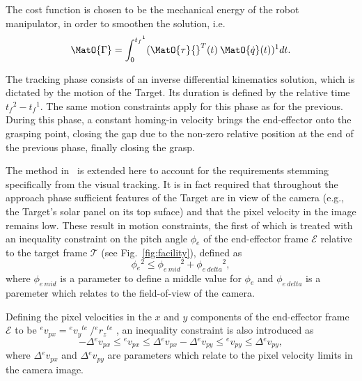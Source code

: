 {The cost function is chosen to be the mechanical energy of the robot manipulator, in order to smoothen the solution, i.e.
\begin{equation}
\MatO{\Gamma} = \int^{t_f{}^1}_{0} (\MatO{\tau}{}^{T}(t) \: \MatO{\dot{q}}(t)){}^{1} dt.
\label{eq:cost}
\end{equation} 

The tracking phase consists of an inverse differential kinematics solution, which is dictated by the motion of the Target. Its duration is defined by the relative time $t_f{}^2 - t_f{}^1$. The same motion constraints apply for this phase as for the previous. During this phase, a constant homing-in velocity brings the end-effector onto the grasping point, closing the gap due to the non-zero relative position at the end of the previous phase, finally closing the grasp. 
} 

The method in~\cite{lampariello2013generating} is extended here to account for the requirements stemming specifically from the visual tracking. It is in fact required that throughout the approach phase sufficient features of the Target are in view of the camera (e.g., the Target's solar panel on its top suface) and that the pixel velocity in the image remains low. These result in motion constraints, the first of which is treated with an inequality constraint on the pitch angle $\phi{}_{e}$ of the end-effector frame $\mathcal{E}$  relative to the target frame $\mathcal{T}$ (see Fig.~\ref{fig:facility}), defined as
\begin{equation}
\phi{}_{e}{}^{2} \leq \phi_{e \: mid}{}^{2} + \phi_{e \: delta}{}^{2},
\end{equation}
where $\phi_{e \: mid}$ is a parameter to define a middle value for $\phi{}_{e}$ and $\phi_{e \: delta}$ is a paremeter which relates to the field-of-view of the camera. 

Defining the pixel velocities in the $x$ and $y$ components of the end-effector frame $\mathcal{E}$ to be ${}^{e}v{}_{px}={}^{e}v{}_{y}{}^{te}\ / {}^{e}r{}_{z}{}^{te}$ , an inequality constraint is also introduced as
\begin{equation}
-\Delta {}^{e}v{}_{px}  \leq {}^{e}v{}_{px} \leq \Delta {}^{e}v{}_{px}
-\Delta {}^{e}v{}_{py}  \leq {}^{e}v{}_{py} \leq \Delta {}^{e}v{}_{py},
\end{equation}
where $\Delta {}^{e}v{}_{px}$ and $\Delta {}^{e}v{}_{py}$ are parameters which relate to the pixel velocity limits in the camera image. 

